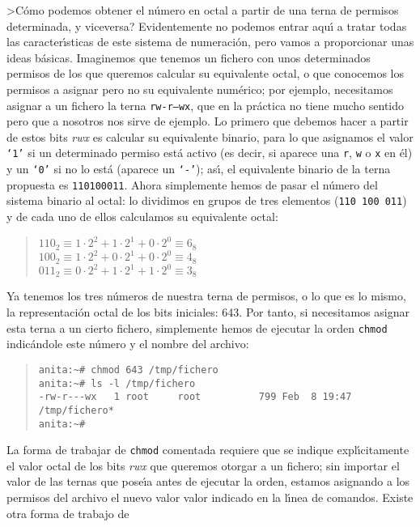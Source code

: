 >C\'omo podemos obtener el n\'umero en octal a partir de una terna de permisos
determinada, y viceversa? Evidentemente no podemos entrar aqu\'{\i} a tratar
todas las caracter\'{\i}sticas de este sistema de numeraci\'on, pero vamos a
proporcionar unas ideas b\'asicas. Imaginemos que tenemos un fichero con unos
determinados permisos de los que queremos calcular su equivalente octal, o que
conocemos los permisos a asignar pero no su equivalente num\'erico; por 
ejemplo, necesitamos asignar a un fichero la terna {\tt rw-r---wx}, que en la
pr\'actica no tiene mucho sentido pero que a nosotros nos sirve de ejemplo.
Lo primero que debemos hacer a partir de estos bits {\it rwx} es calcular su
equivalente binario, para lo que asignamos el valor {\tt `1'} si un determinado
permiso est\'a activo (es decir, si aparece una {\tt r}, {\tt w} o {\tt x} en
\'el) y un {\tt `0'} si no lo est\'a (aparece un {\tt `-'}); as\'{\i}, el 
equivalente binario de la terna propuesta es {\tt 110100011}. Ahora simplemente
hemos de pasar el n\'umero del sistema binario al octal: lo dividimos en 
grupos de tres elementos ({\tt 110 100 011}) y de cada uno de ellos calculamos
su equivalente octal:
\begin{quote}
$110_{2}\equiv 1\cdot 2^{2} + 1\cdot 2^{1} + 0\cdot 2^{0} \equiv 6_{8}$\\
$100_{2}\equiv 1\cdot 2^{2} + 0\cdot 2^{1} + 0\cdot 2^{0} \equiv 4_{8}$\\
$011_{2}\equiv 0\cdot 2^{2} + 1\cdot 2^{1} + 1\cdot 2^{0} \equiv 3_{8}$
\end{quote}
Ya tenemos los tres n\'umeros de nuestra terna de permisos, o lo que es lo
mismo, la representaci\'on octal de los bits iniciales: 643. Por tanto, si
necesitamos asignar esta terna a un cierto fichero, simplemente hemos de 
ejecutar la orden {\tt chmod} indic\'andole este n\'umero y el nombre del
archivo:
\begin{quote}
\begin{verbatim}
anita:~# chmod 643 /tmp/fichero
anita:~# ls -l /tmp/fichero 
-rw-r---wx   1 root     root          799 Feb  8 19:47 /tmp/fichero*
anita:~#
\end{verbatim}
\end{quote}
La forma de trabajar de {\tt chmod} comentada requiere que se indique 
expl\'{\i}citamente el valor octal de los bits {\it rwx} que queremos otorgar
a un fichero; sin importar el valor de las ternas que pose\'{\i}a antes de
ejecutar la orden, estamos asignando a los permisos del archivo el nuevo valor 
valor indicado en la l\'{\i}nea de comandos. Existe otra forma de trabajo de
